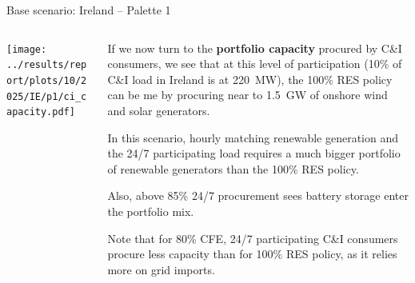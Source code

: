 \begin{frame}{Base scenario: Ireland -- Palette 1}

  {\footnotesize
  \vspace{0.3cm}
  
  \begin{columns}[T]
  \begin{column}{9cm}
  \centering
  
  \texttt{[image: ../results/report/plots/10/2025/IE/p1/ci\_capacity.pdf]}
  \end{column}
  \begin{column}{6cm}
  
  \vspace{0.1cm}
  If we now turn to the {\bf portfolio capacity} procured by 
  C\&I consumers, we see that at this level of participation
  (10\% of C\&I load in Ireland is at 220~MW), the 100\% RES policy can be 
  me by procuring near to 1.5~GW of onshore wind and solar generators.
  
  \vspace{0.3cm}
  In this scenario, hourly matching renewable generation and the 24/7 participating load
  requires a \alert{much bigger portfolio} of renewable generators than the 
  100\% RES policy. 

  \vspace{0.3cm}
  Also, above 85\% 24/7 procurement sees \alert{battery storage} enter the portfolio  mix.
  
  \vspace{0.3cm}
  Note that for 80\% CFE, 24/7 participating C\&I consumers procure less 
  capacity than for 100\% RES policy, as it relies more on grid imports.

  \end{column}
  \end{columns}
  }
  \end{frame}



